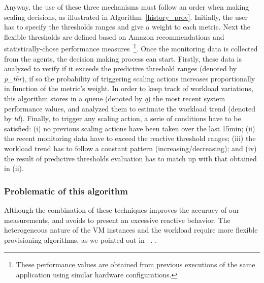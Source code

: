 
\vspace{3mm}

Anyway, the use of these three mechanisms must follow an order when making scaling decisions, as illustrated in Algorithm~\ref{history_prov}. Initially, the user has to specify the thresholds ranges and give a weight to each metric. Next the flexible thresholds are defined based on Amazon recommendations and statistically-chose performance measures~\footnote{These performance values are obtained from previous executions of the same application using similar hardware configurations.}. Once the monitoring data is collected from the agents, the decision making process can start. Firstly, these data is analyzed to verify if it exceeds the predictive threshold ranges (denoted by \emph{p\_thr}), if so the probability of triggering scaling actions increases proportionally in function of the metric's weight. In order to keep track of workload variations, this algorithm stores in a queue (denoted by \emph{q}) the most recent system performance values, and analyzed them  to estimate the workload trend (denoted by \emph{td}). Finally, to trigger any scaling action, a serie of conditions have to be satisfied: (i) no previous scaling actions have been taken over the last 15min; (ii) the recent monitoring data have to exceed the reactive threshold ranges; (iii) the workload trend has to follow a constant pattern (increasing/decreasing); and (iv) the result of predictive thresholds evaluation has to match up with that obtained in (ii). 

\subsubsection{Problematic of this algorithm}

Although the combination of these techniques improves the accuracy of our measurements, and avoids to present an excessive reactive behavior. The heterogeneous nature of the VM instances and the workload require more flexible provisioning algorithms, as we pointed out in ~\cite{jiangThesis}. . 

